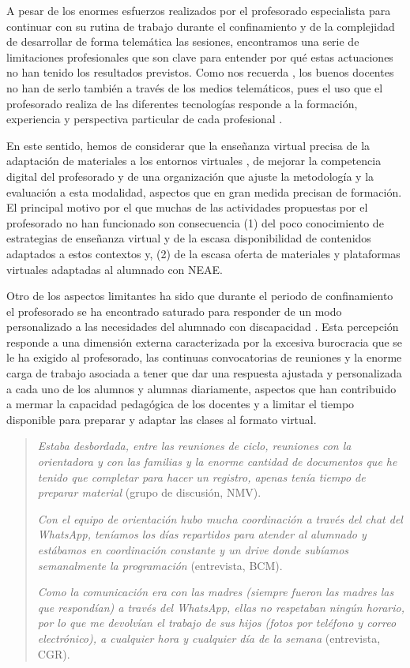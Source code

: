 \documentclass{textolivre}
\begin{document}
A pesar de los enormes esfuerzos realizados por el profesorado especialista para continuar con su rutina de trabajo durante el confinamiento y de la complejidad de desarrollar de forma telemática las sesiones, encontramos una serie de limitaciones profesionales que son clave para entender por qué estas actuaciones no han tenido los resultados previstos. Como nos recuerda \textcite{fernandezdomingues2020}, %
los buenos docentes no han de serlo también a través de los medios telemáticos, pues el uso que el profesorado realiza de las diferentes tecnologías responde a la formación, experiencia y perspectiva particular de cada profesional \cite{marin2020}. %

En este sentido, hemos de considerar que la enseñanza virtual precisa de la adaptación de materiales a los entornos virtuales \cite{berastegui2020}, %
de mejorar la competencia digital del profesorado y de una organización que ajuste la metodología y la evaluación a esta modalidad, aspectos que en gran medida precisan de formación. El principal motivo por el que muchas de las actividades propuestas por el profesorado no han funcionado son consecuencia (1) del poco conocimiento de estrategias de enseñanza virtual y de la escasa disponibilidad de contenidos adaptados a estos contextos \cite{rogero2020} %
y, (2) de la escasa oferta de materiales y plataformas virtuales adaptadas al alumnado con NEAE.

Otro de los aspectos limitantes ha sido que durante el periodo de confinamiento el profesorado se ha encontrado saturado para responder de un modo personalizado a las necesidades del alumnado con discapacidad \cite{vega2020}. %
Esta percepción responde a una dimensión externa caracterizada por la excesiva burocracia que se le ha exigido al profesorado, las continuas convocatorias de reuniones y la enorme carga de trabajo asociada a tener que dar una respuesta ajustada y personalizada a cada uno de los alumnos y alumnas diariamente, aspectos que han contribuido a mermar la capacidad pedagógica de los docentes y a limitar el tiempo disponible para preparar y adaptar las clases al formato virtual. 

\begin{quote}
\emph{Estaba desbordada, entre las reuniones de ciclo, reuniones con la orientadora y con las familias y la enorme cantidad de documentos que he tenido que completar para hacer un registro, apenas tenía tiempo de preparar material} (grupo de discusión, NMV).

\emph{Con el equipo de orientación hubo mucha coordinación a través del chat del WhatsApp, teníamos los días repartidos para atender al alumnado y estábamos en coordinación constante y un drive donde subíamos semanalmente la programación} (entrevista, BCM).

\emph{Como la comunicación era con las madres (siempre fueron las madres las que respondían) a través del WhatsApp, ellas no respetaban ningún horario, por lo que me devolvían el trabajo de sus hijos (fotos por teléfono y correo electrónico), a cualquier hora y cualquier día de la semana} (entrevista, CGR).
\end{quote}
\end{document}
